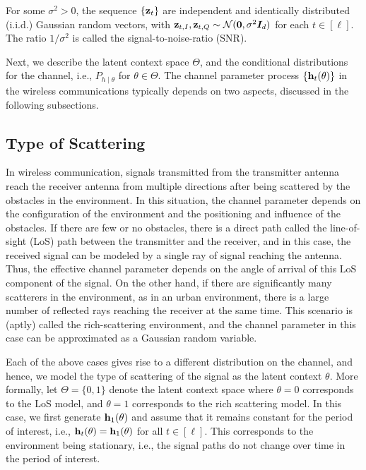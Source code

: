 \documentclass[journal,letterpaper,onecolumn]{IEEEtran}
\begin{document}
For some $\sigma^2 > 0$, the sequence $\{{\mathbf{z}}_t\}$ are independent and identically distributed (i.i.d.) Gaussian random vectors, with ${\mathbf{z}}_{t, I},{\mathbf{z}}_{t,Q}\sim \mathcal{N}(\mathbf{0}, \sigma^2 {\bm{I}}_{d})$ for each $t\in[\ell]$. The ratio $1/\sigma^2$ is called the signal-to-noise-ratio (SNR).




Next, we describe the latent context space $\Theta$, and the conditional distributions for the channel, i.e., $P_{h\mid \theta}$ for $\theta\in\Theta$. The channel parameter process $\{{\mathbf{h}}_t(\theta)\}$ in the wireless communications typically depends on two aspects, discussed in the following subsections.


\subsection{Type of Scattering}

In wireless communication, signals transmitted from the transmitter antenna reach the receiver antenna from multiple directions after being scattered by the obstacles in the environment. In this situation, the channel parameter depends on the configuration of the environment and the positioning and influence of the obstacles. If there are few or no obstacles, there is a direct path called the line-of-sight (LoS) path between the transmitter and the receiver, and in this case, the received signal can be modeled by a single ray of signal reaching the antenna. Thus, the effective channel parameter depends on the angle of arrival of this LoS component of the signal. On the other hand, if there are significantly many scatterers in the environment, as in an urban environment, there is a large number of reflected rays reaching the receiver at the same time. This scenario is (aptly) called the rich-scattering environment, and the channel parameter in this case can be approximated as a Gaussian random variable. 

Each of the above cases gives rise to a different distribution on the channel, and hence, we model the type of scattering of the signal as the latent context $\theta$. More formally, let $\Theta=\{0, 1\}$ denote the latent context space where $\theta = 0$ corresponds to the LoS model, and $\theta=1$ corresponds to the rich scattering model. In this case, we first generate ${\mathbf{h}}_1(\theta)$ and assume that it remains constant for the period of interest, i.e., ${\mathbf{h}}_t(\theta) = {\mathbf{h}}_1(\theta)$ for all $t\in[\ell]$. This corresponds to the environment being stationary, i.e., the signal paths do not change over time in the period of interest.
\end{document}
